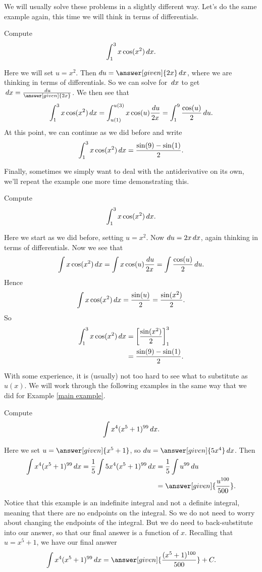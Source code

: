 \documentclass{ximera}
\begin{document}
We will usually solve these problems in a slightly different way. Let's do the same
example again, this time we will think in terms of differentials.

\begin{example}\label{main example}
Compute
\[
\int_1^3 x\cos(x^2)\,d x.
\]
\begin{explanation}
Here we will set $u=x^2$. Then $du = \answer[given]{2x} \d x$, where we are thinking in terms
of differentials. So we can solve for $\,d x$ to get $\d x = \frac{\d u}{\answer[given]{2x}}$.  We then see that
\[
\int_1^3 x \cos(x^2) \,d x = \int_{u(1)}^{u(3)} x \cos(u) \frac{\,d u}{2x} = \int_{1}^{9} \frac{\cos(u)}{2}\,d u .
\]
At this point, we can continue as we did before and write
\[
\int_1^3 x\cos(x^2)\,d x= \frac{\sin(9) -\sin(1)}{2}.
\]
\end{explanation}
\end{example}

Finally, sometimes we simply want to deal with the antiderivative on
its own, we'll repeat the example one more time demonstrating this.

\begin{example}
Compute
\[
\int_1^3 x\cos(x^2)\,d x.
\]
\begin{explanation}
Here we start as we did before, setting $u=x^2$. Now $du = 2x \,d x$,
again thinking in terms of differentials. Now we see that
\[
\int x \cos(x^2) \,d x = \int x \cos(u) \frac{\,d u}{2x} = \int \frac{\cos(u)}{2}\,d u .
\]
Hence 
\[
\int x\cos(x^2)\,d x = \frac{\sin(u)}{2} = \frac{\sin(x^2)}{2}.
\]
So
\begin{align*}
\int_1^3 x\cos(x^2)\,d x &=\bigg[ \frac{\sin(x^2)}{2} \bigg]_1^3\\
&= \frac{\sin(9) -\sin(1)}{2}.
\end{align*}
\end{explanation}
\end{example}

With some experience, it is (usually) not too hard to see what to substitute as $u(x)$.
We will work through the following examples in the same way that we did for Example \ref{main example}.  

\begin{example}
Compute
\[
\int x^4(x^5+1)^{99} \,d x.
\]
\begin{explanation}
Here we set $u = \answer[given]{x^5+1}$, so $du = \answer[given]{5x^4} \d x$.  Then
\begin{align*}
\int x^4(x^5+1)^{99} \d x = \frac{1}{5} \int 5x^4 (x^5+1)^{99} \d x &= \frac{1}{5} \int u^{99} \d u\\
&= \answer[given]{\frac{u^{100}}{500}}.
\end{align*}
Notice that this example is an indefinite integral and not a definite integral, meaning that there are no endpoints on the integral.  
So we do not need to worry about changing the endpoints of the integral.  
But we do need to back-substitute into our answer, so that our final answer is a function of $x$.  
Recalling that $u = x^5+1$, we have our final answer
\[
\int x^4(x^5+1)^{99} \d x= \answer[given]{\frac{(x^5+1)^{100}}{500}}+C.
\]
\end{explanation}
\end{example}
\end{document}
